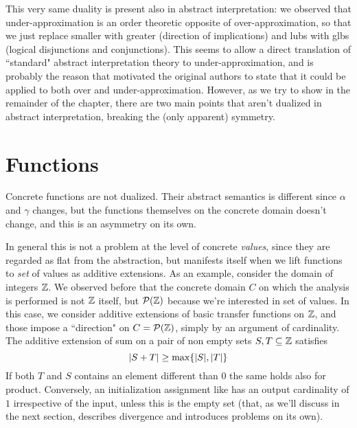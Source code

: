 This very same duality is present also in abstract interpretation: we observed that under-approximation is an order theoretic opposite of over-approximation, so that we just replace smaller with greater (direction of implications) and lubs with glbs (logical disjunctions and conjunctions).
This seems to  allow a direct translation of ``standard" abstract interpretation theory to under-approximation, and is probably the reason that motivated the original authors to state that it could be applied to both over and under-approximation. However, as we try to show in the remainder of the chapter, there are two main points that aren't dualized in abstract interpretation, breaking the (only apparent) symmetry.

\section{Functions}
Concrete functions are not dualized. Their abstract semantics is different since $\alpha$ and $\gamma$ changes, but the functions themselves on the concrete domain doesn't change, and this is an asymmetry on its own.

In general this is not a problem at the level of concrete \textit{values}, since they are regarded as flat from the abstraction, but manifests itself when we lift functions to \textit{set} of values as additive extensions.
As an example, consider the domain of integers $\mathbb{Z}$. We observed before that the concrete domain $C$ on which the analysis is performed is not $\mathbb{Z}$ itself, but $\mathcal{P}(\mathbb{Z})$ because we're interested in set of values. In this case, we consider additive extensions of basic transfer functions on $\mathbb{Z}$, and those impose a ``direction" on $C = \mathcal{P}(\mathbb{Z})$, simply by an argument of cardinality.
The additive extension of sum on a pair of non empty sets $S, T \subseteq \mathbb{Z}$ satisfies
\[
\lvert S + T\rvert \ge \max\{ \lvert S\rvert, \lvert T\rvert \}
\]
If both $T$ and $S$ contains an element different than $0$ the same holds also for product.
Conversely, an initialization assignment like  has an output cardinality of $1$ irrespective of the input, unless this is the empty set (that, as we'll discuss in the next section, describes divergence and introduces problems on its own).

